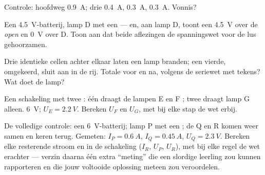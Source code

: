\begin{exercise}[$\star$]\label{exo:g8:circuit-laws:8}
Controle: hoofdweg \qty{0.9}{A}; drie  \qty{0.4}{A},
\qty{0.3}{A}, \qty{0.3}{A}. Vonnis?
\end{exercise}

\begin{exercise}[$\star\star$]\label{exo:g8:circuit-laws:9}
Een \qty{4.5}{V}-batterij, lamp D  met een
 --- en,  aan lamp D, toont een
 \qty{4.5}{V} over de \emph{open}
 en \qty{0}{V} over D. Toon aan dat beide aflezingen
de spanningswet voor de lus gehoorzamen.
\end{exercise}

\begin{exercise}[$\star\star$]\label{exo:g8:circuit-laws:10}
Drie identieke cellen achter elkaar laten een lamp
branden; een vierde, omgekeerd, sluit aan in de rij. Totale
 voor en na, volgens de seriewet met tekens? Wat doet
de lamp?
\end{exercise}

\begin{exercise}[$\star\star$]\label{exo:g8:circuit-laws:11}
Een schakeling met twee :  één draagt de
lampen E en F ;  twee draagt lamp G
alleen.  \qty{6}{V}; $U_E = \qty{2.2}{V}$. Bereken $U_F$
en $U_G$, met bij elke stap de wet erbij.
\end{exercise}

\begin{exercise}[$\star\star\star$]\label{exo:g8:circuit-laws:12}
De volledige controle: een \qty{6}{V}-batterij; lamp P
 met een ; de  Q
en R komen weer samen en keren terug. Gemeten: $I_P = \qty{0.6}{A}$,
$I_Q = \qty{0.45}{A}$, $U_Q = \qty{2.3}{V}$. Bereken elke resterende
stroom en  in de schakeling ($I_R$, $U_P$, $U_R$), met
bij elke regel de wet erachter --- verzin daarna één extra ``meting''
die een slordige leerling zou kunnen rapporteren en die jouw voltooide
oplossing meteen zou veroordelen.
\end{exercise}

